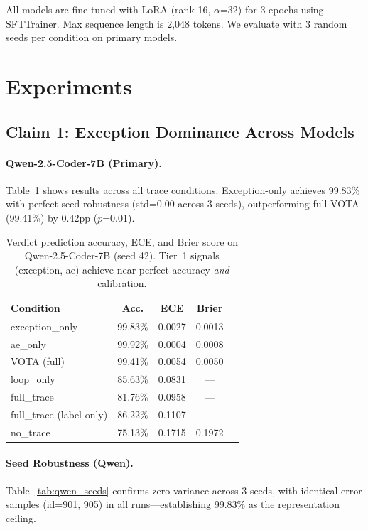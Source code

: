 \documentclass[11pt,a4paper]{article}
\begin{document}
All models are fine-tuned with LoRA (rank 16, $\alpha$=32) for 3 epochs using SFTTrainer. Max sequence length is 2,048 tokens. We evaluate with 3 random seeds per condition on primary models.

\section{Experiments}

\subsection{Claim 1: Exception Dominance Across Models}

\paragraph{Qwen-2.5-Coder-7B (Primary).} Table~\ref{tab:qwen_main} shows results across all trace conditions. Exception-only achieves 99.83\% with perfect seed robustness (std=0.00 across 3 seeds), outperforming full VOTA (99.41\%) by 0.42pp ($p$=0.01).

\begin{table}[t]
\centering
\small
\begin{tabular}{lcccc}
\toprule
\textbf{Condition} & \textbf{Acc.} & \textbf{ECE} & \textbf{Brier} \\
\midrule
exception\_only & 99.83\% & 0.0027 & 0.0013 \\
ae\_only & 99.92\% & 0.0004 & 0.0008 \\
VOTA (full) & 99.41\% & 0.0054 & 0.0050 \\
loop\_only & 85.63\% & 0.0831 & --- \\
full\_trace & 81.76\% & 0.0958 & --- \\
full\_trace (label-only) & 86.22\% & 0.1107 & --- \\
no\_trace & 75.13\% & 0.1715 & 0.1972 \\
\bottomrule
\end{tabular}
\caption{Verdict prediction accuracy, ECE, and Brier score on Qwen-2.5-Coder-7B (seed 42). Tier~1 signals (exception, ae) achieve near-perfect accuracy \emph{and} calibration.}
\label{tab:qwen_main}
\end{table}

\paragraph{Seed Robustness (Qwen).} Table~\ref{tab:qwen_seeds} confirms zero variance across 3 seeds, with identical error samples (id=901, 905) in all runs---establishing 99.83\% as the representation ceiling.
\end{document}
